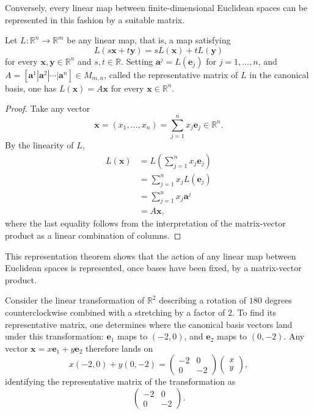 Conversely, every linear map between finite-dimensional Euclidean spaces can be represented in this fashion by a suitable matrix.

\begin{theorem}
Let $L : \mathbb{R}^n \to \mathbb{R}^m$ be any linear map, that is, a map satisfying
\[
L(s\mathbf{x}+t\mathbf{y}) = sL(\mathbf{x}) + tL(\mathbf{y})
\]
 for every $\mathbf{x}, \mathbf{y} \in \mathbb{R}^n$ and $s, t \in \mathbb{R}$. Setting $\mathbf{a}^j = L(\mathbf{e}_j)$ for $j = 1, \dots, n$, and $A = [\mathbf{a}^1 | \mathbf{a}^2 | \cdots | \mathbf{a}^n] \in M_{m,n}$, called the representative matrix of $L$ in the canonical basis, one has $L(\mathbf{x}) = A\mathbf{x}$ for every $\mathbf{x} \in \mathbb{R}^n$.
\end{theorem}

\begin{proof}
Take any vector
\[
\mathbf{x} = (x_1, \dots, x_n) = \sum_{j=1}^n x_j \mathbf{e}_j \in \mathbb{R}^n.
\]
By the linearity of $L$,
\[
\begin{aligned}
L(\mathbf{x}) &= L( \sum_{j=1}^n x_j \mathbf{e}_j ) \\
&= \sum_{j=1}^n x_j L(\mathbf{e}_j) \\
&= \sum_{j=1}^n x_j \mathbf{a}^j \\
&= A\mathbf{x},
\end{aligned}
\]
where the last equality follows from the interpretation of the matrix-vector product as a linear combination of columns.
\end{proof}

This representation theorem shows that the action of any linear map between Euclidean spaces is represented, once bases have been fixed, by a matrix-vector product.

\begin{example}
Consider the linear transformation of $\mathbb{R}^2$ describing a rotation of $180$ degrees counterclockwise combined with a stretching by a factor of $2$. To find its representative matrix, one determines where the canonical basis vectors land under this transformation: $\mathbf{e}_1$ maps to $(-2,0)$, and $\mathbf{e}_2$ maps to $(0,-2)$. Any vector $\mathbf{x} = x\mathbf{e}_1 + y\mathbf{e}_2$ therefore lands on
\[
x(-2,0) + y(0,-2) = \begin{pmatrix} -2 & 0 \\ 0 & -2 \end{pmatrix} \begin{pmatrix} x \\ y \end{pmatrix},
\]
identifying the representative matrix of the transformation as
\[
\begin{pmatrix} -2 & 0 \\ 0 & -2 \end{pmatrix}.
\]

\end{example}

